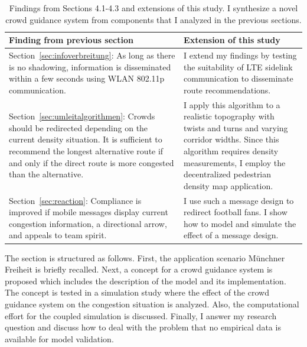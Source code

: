 \begin{table}[hbt!]
\begin{tabular}{p{}p{}}
\toprule
 Finding from previous section & Extension of this study \\ \midrule
 Section~\ref{sec:infoverbreitung}: \newline As long as there is no shadowing, information is disseminated within a few seconds using WLAN 802.11p communication.  & I extend my findings by testing the suitability of LTE sidelink communication to disseminate route recommendations.       \\ \hline
Section~\ref{sec:umleitalgorithmen}: \newline     Crowds should be redirected depending on the current density situation. It is sufficient to recommend the longest alternative route if and only if the direct route is more congested than the alternative.     & 
I apply this algorithm to a realistic topography with twists and turns and varying corridor widths.     
Since this algorithm requires density measurements, I employ the decentralized pedestrian density map application.    
    \\ \hline
 Section~\ref{sec:reaction}: \newline  Compliance is improved if mobile messages display current congestion information, a directional arrow, and appeals to team spirit.     & I use such a message design to redirect football fans. I show how to model and simulate the effect of a message design.         \\
  
 \bottomrule
\end{tabular}
\caption[Findings from Sections 4.1-4.3 and planned extensions]{Findings from Sections 4.1-4.3 and extensions of this study. I synthesize a novel crowd guidance system from components that I analyzed in the previous sections. }
\label{tab:overviewfindings}
\end{table}



The section is structured as follows. First, the application scenario Münchner Freiheit is briefly recalled. Next, a concept for a crowd guidance system is proposed which includes the description of the model and its implementation.  The concept is tested in a simulation study where the effect of the crowd guidance system on the congestion situation is analyzed. Also, the computational effort for the coupled simulation is discussed. Finally, I answer my research question and discuss how to deal with the problem that no empirical data is available for model validation.



